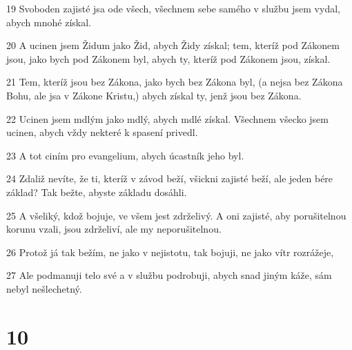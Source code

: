 \par 19 Svoboden zajisté jsa ode všech, všechnem sebe samého v službu jsem vydal, abych mnohé získal.
\par 20 A ucinen jsem Židum jako Žid, abych Židy získal; tem, kteríž pod Zákonem jsou, jako bych pod Zákonem byl, abych ty, kteríž pod Zákonem jsou, získal.
\par 21 Tem, kteríž jsou bez Zákona, jako bych bez Zákona byl, (a nejsa bez Zákona Bohu, ale jsa v Zákone Kristu,) abych získal ty, jenž jsou bez Zákona.
\par 22 Ucinen jsem mdlým jako mdlý, abych mdlé získal. Všechnem všecko jsem ucinen, abych vždy nekteré k spasení privedl.
\par 23 A tot ciním pro evangelium, abych úcastník jeho byl.
\par 24 Zdaliž nevíte, že ti, kteríž v závod beží, všickni zajisté beží, ale jeden bére základ? Tak bežte, abyste základu dosáhli.
\par 25 A všeliký, kdož bojuje, ve všem jest zdrželivý. A oni zajisté, aby porušitelnou korunu vzali, jsou zdrželiví, ale my neporušitelnou.
\par 26 Protož já tak bežím, ne jako v nejistotu, tak bojuji, ne jako vítr rozrážeje,
\par 27 Ale podmanuji telo své a v službu podrobuji, abych snad jiným káže, sám nebyl nešlechetný.

\chapter{10}

